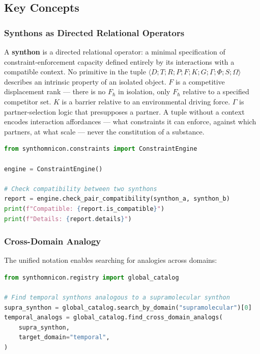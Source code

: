 \documentclass[12pt,a4paper]{article}
\begin{document}
\subsection{Key Concepts}

\subsubsection{Synthons as Directed Relational Operators}

A \textbf{synthon} is a directed relational operator: a minimal specification of constraint-enforcement capacity defined entirely by its interactions with a compatible context. No primitive in the tuple $\langle D; T; R; P; F; K; G; \Gamma; \Phi; S; \Omega \rangle$ describes an intrinsic property of an isolated object. $F$ is a competitive displacement rank --- there is no $F_\hbar$ in isolation, only $F_\hbar$ relative to a specified competitor set. $K$ is a barrier relative to an environmental driving force. $\Gamma$ is partner-selection logic that presupposes a partner. A tuple without a context encodes interaction affordances --- what constraints it can enforce, against which partners, at what scale --- never the constitution of a substance.

\begin{lstlisting}[language=Python]
from synthomnicon.constraints import ConstraintEngine

engine = ConstraintEngine()

# Check compatibility between two synthons
report = engine.check_pair_compatibility(synthon_a, synthon_b)
print(f"Compatible: {report.is_compatible}")
print(f"Details: {report.details}")
\end{lstlisting}

\subsubsection{Cross-Domain Analogy}

The unified notation enables searching for analogies across domains:

\begin{lstlisting}[language=Python]
from synthomnicon.registry import global_catalog

# Find temporal synthons analogous to a supramolecular synthon
supra_synthon = global_catalog.search_by_domain("supramolecular")[0]
temporal_analogs = global_catalog.find_cross_domain_analogs(
    supra_synthon,
    target_domain="temporal",
)
\end{lstlisting}
\end{document}
